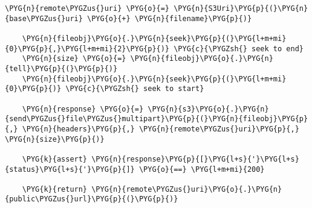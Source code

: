 \begin{Verbatim}[commandchars=\\\{\}]
    \PYG{n}{remote\PYGZus{}uri} \PYG{o}{=} \PYG{n}{S3Uri}\PYG{p}{(}\PYG{n}{base\PYGZus{}uri} \PYG{o}{+} \PYG{n}{filename}\PYG{p}{)}

    \PYG{n}{fileobj}\PYG{o}{.}\PYG{n}{seek}\PYG{p}{(}\PYG{l+m+mi}{0}\PYG{p}{,}\PYG{l+m+mi}{2}\PYG{p}{)} \PYG{c}{\PYGZsh{} seek to end}
    \PYG{n}{size} \PYG{o}{=} \PYG{n}{fileobj}\PYG{o}{.}\PYG{n}{tell}\PYG{p}{(}\PYG{p}{)}
    \PYG{n}{fileobj}\PYG{o}{.}\PYG{n}{seek}\PYG{p}{(}\PYG{l+m+mi}{0}\PYG{p}{)} \PYG{c}{\PYGZsh{} seek to start}

    \PYG{n}{response} \PYG{o}{=} \PYG{n}{s3}\PYG{o}{.}\PYG{n}{send\PYGZus{}file\PYGZus{}multipart}\PYG{p}{(}\PYG{n}{fileobj}\PYG{p}{,} \PYG{n}{headers}\PYG{p}{,} \PYG{n}{remote\PYGZus{}uri}\PYG{p}{,} \PYG{n}{size}\PYG{p}{)}

    \PYG{k}{assert} \PYG{n}{response}\PYG{p}{[}\PYG{l+s}{'}\PYG{l+s}{status}\PYG{l+s}{'}\PYG{p}{]} \PYG{o}{==} \PYG{l+m+mi}{200}

    \PYG{k}{return} \PYG{n}{remote\PYGZus{}uri}\PYG{o}{.}\PYG{n}{public\PYGZus{}url}\PYG{p}{(}\PYG{p}{)}
\end{Verbatim}


